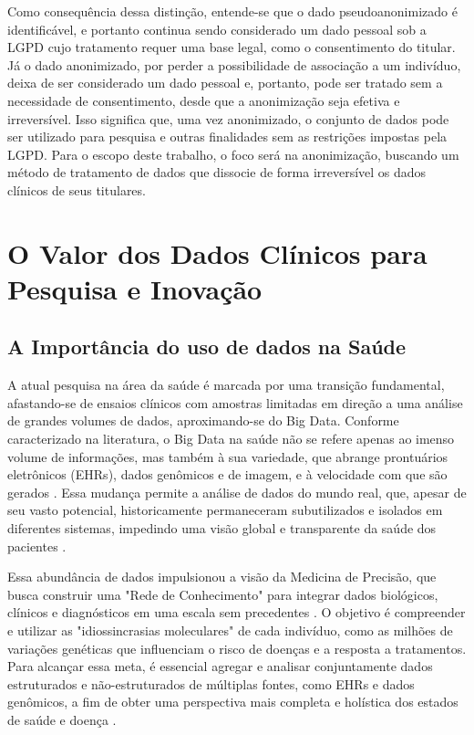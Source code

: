 Como consequência dessa distinção, entende-se que o dado pseudoanonimizado é identificável, e portanto continua sendo considerado um dado pessoal sob a LGPD cujo tratamento requer uma base legal, como o consentimento do titular. Já o dado anonimizado, por perder a possibilidade de associação a um indivíduo, deixa de ser considerado um dado pessoal e, portanto, pode ser tratado sem a necessidade de consentimento, desde que a anonimização seja efetiva e irreversível. Isso significa que, uma vez anonimizado, o conjunto de dados pode ser utilizado para pesquisa e outras finalidades sem as restrições impostas pela LGPD. Para o escopo deste trabalho, o foco será na anonimização, buscando um método de tratamento de dados que dissocie de forma irreversível os dados clínicos de seus titulares.

\section{O Valor dos Dados Clínicos para Pesquisa e Inovação}
\label{sec:fund-valor-dados}

\subsection{A Importância do uso de dados na Saúde}
\label{subsec:fund-importancia-dados}
A atual pesquisa na área da saúde é marcada por uma transição fundamental, afastando-se de ensaios clínicos com amostras limitadas em direção a uma análise de grandes volumes de dados, aproximando-se do Big Data. Conforme caracterizado na literatura, o Big Data na saúde não se refere apenas ao imenso volume de informações, mas também à sua variedade, que abrange prontuários eletrônicos (EHRs), dados genômicos e de imagem, e à velocidade com que são gerados \cite{Belle2015}. Essa mudança permite a análise de dados do mundo real, que, apesar de seu vasto potencial, historicamente permaneceram subutilizados e isolados em diferentes sistemas, impedindo uma visão global e transparente da saúde dos pacientes \cite{Belle2015}.

Essa abundância de dados impulsionou a visão da Medicina de Precisão, que busca construir uma "Rede de Conhecimento" para integrar dados biológicos, clínicos e diagnósticos em uma escala sem precedentes \cite{NationalResearchCouncil2011}. O objetivo é compreender e utilizar as "idiossincrasias moleculares" de cada indivíduo, como as milhões de variações genéticas que influenciam o risco de doenças e a resposta a tratamentos. Para alcançar essa meta, é essencial agregar e analisar conjuntamente dados estruturados e não-estruturados de múltiplas fontes, como EHRs e dados genômicos, a fim de obter uma perspectiva mais completa e holística dos estados de saúde e doença \cite{Belle2015, NationalResearchCouncil2011}.

